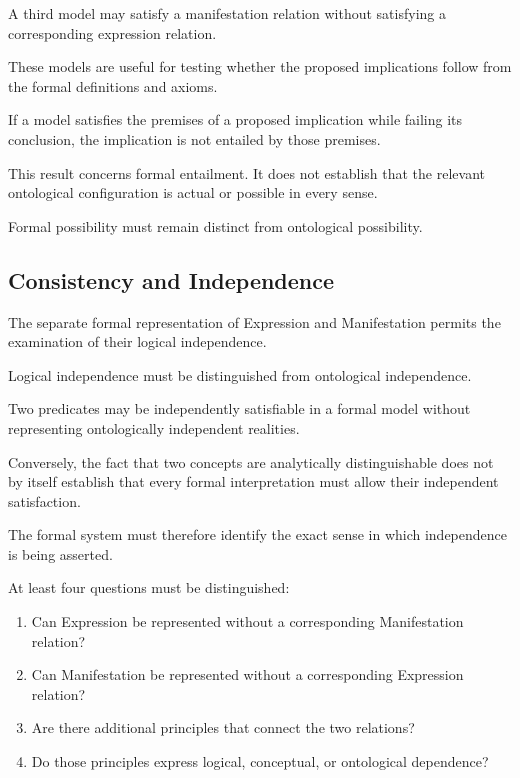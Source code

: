 A third model may
satisfy a manifestation
relation without satisfying
a corresponding expression
relation.

These models are useful
for testing whether
the proposed implications
follow from the formal
definitions and axioms.

If a model satisfies
the premises of a proposed
implication while failing
its conclusion, the
implication is not
entailed by those
premises.

This result concerns
formal entailment.
It does not establish
that the relevant
ontological configuration
is actual or possible
in every sense.

Formal possibility
must remain distinct
from ontological possibility.

\subsection{Consistency and Independence}

The separate formal
representation of Expression
and Manifestation permits
the examination of their
logical independence.

Logical independence
must be distinguished
from ontological
independence.

Two predicates may
be independently
satisfiable in a formal
model without representing
ontologically independent
realities.

Conversely, the fact
that two concepts are
analytically distinguishable
does not by itself
establish that every
formal interpretation
must allow their
independent satisfaction.

The formal system
must therefore identify
the exact sense in
which independence
is being asserted.

At least four questions
must be distinguished:

\begin{enumerate}
    \item Can Expression
    be represented without
    a corresponding
    Manifestation relation?
    \item Can Manifestation
    be represented without
    a corresponding
    Expression relation?
    \item Are there additional
    principles that connect
    the two relations?
    \item Do those principles
    express logical,
    conceptual, or
    ontological dependence?
\end{enumerate}

